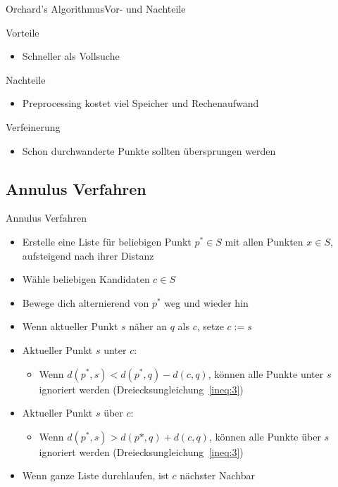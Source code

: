 \documentclass{beamer}
\begin{document}
\begin{frame}{Orchard’s Algorithmus}{Vor- und Nachteile}
 \begin{block}{Vorteile}
  \begin{itemize}
   \item Schneller als Vollsuche
  \end{itemize}
 \end{block}
 \pause
 \begin{block}{Nachteile}
  \begin{itemize}
   \item Preprocessing kostet viel Speicher und Rechenaufwand
  \end{itemize}
 \end{block}
 \pause
 \begin{block}{Verfeinerung}
  \begin{itemize}
   \item Schon durchwanderte Punkte sollten übersprungen werden
  \end{itemize}
 \end{block}
\end{frame}

\subsection{Annulus Verfahren}
\begin{frame}{Annulus Verfahren}
 \begin{itemize}
  \item Erstelle eine Liste für beliebigen Punkt $p^* \in S$ mit allen Punkten $x \in S$, aufsteigend nach ihrer Distanz
  \pause
  \item Wähle beliebigen Kandidaten $c \in S$
  \pause
  \item Bewege dich alternierend von $p^*$ weg und wieder hin
  \pause
  \item Wenn aktueller Punkt $s$ näher an $q$ als $c$, setze $c:= s$
  \pause
  \item Aktueller Punkt $s$ unter $c$:
  \begin{itemize}
   \item Wenn $d(p^*, s) < d(p^*, q) - d(c, q)$, können alle Punkte unter $s$ ignoriert werden (Dreiecksungleichung~\ref{ineq:3})
  \end{itemize}
  \pause
  \item Aktueller Punkt $s$ über $c$:
  \begin{itemize}
   \item Wenn $d(p^*, s) > d(p*, q) + d(c, q)$, können alle Punkte über $s$ ignoriert werden (Dreiecksungleichung~\ref{ineq:3})
  \end{itemize}
  \pause
  \item Wenn ganze Liste durchlaufen, ist $c$ nächster Nachbar
 \end{itemize}
\end{frame}
\end{document}

